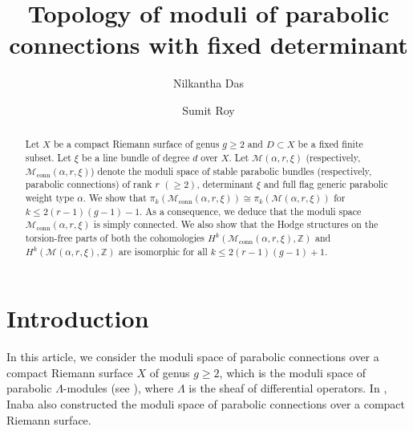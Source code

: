 \documentclass[11pt, reqno]{amsart}
\numberwithin{equation}{section}
\theoremstyle{definition}
\begin{document}
	\title[Topology of moduli of parabolic connections with fixed determinant]{Topology of moduli of parabolic connections with fixed determinant}
	
\author[N. Das]{Nilkantha Das}
\address{Department of Mathematics, Birla Institute of Technology Mesra, Mesra, Ranchi 835215, India}

	\author[S. Roy]{Sumit Roy}
 \address{Stat-Math Unit, Indian Statistical Institute, 203 B.T. Road, Kolkata 700 108, India.}


	
	\begin{abstract}
		Let $X$ be a compact Riemann surface of genus $g \geq 2$ and $D\subset X$ be a fixed finite subset. Let $\xi$ be a line bundle of degree $d$ over $X$. Let $\mathcal{M}(\alpha, r, \xi)$ (respectively, $\mathcal{M}_{\mathrm{conn}}(\alpha, r, \xi)$) denote the moduli space of stable parabolic bundles (respectively, parabolic connections) of rank $r$ $(\geq 2)$, determinant $\xi$ and full flag generic parabolic weight type $\alpha$. We show that $
  \pi_k(\mathcal{M}_{\mathrm{conn}}(\alpha, r, \xi)) \cong \pi_k(\mathcal{M}(\alpha, r, \xi)) $ for $k \leq2(r-1)(g-1)-1$. As a consequence, we deduce that the moduli space $\mathcal{M}_{\mathrm{conn}}(\alpha, r, \xi)$ is simply connected. We also show that the Hodge structures on the torsion-free parts of both the cohomologies $H^k(\mathcal{M}_{\mathrm{conn}}(\alpha, r, \xi),\mathbb{Z})$ and $H^k(\mathcal{M}(\alpha, r, \xi),\mathbb{Z})$ are isomorphic for all $k\leq 2(r-1)(g-1)+1$.
	\end{abstract}
	\maketitle
	
	\section{Introduction}

 In this article, we consider the moduli space of parabolic connections over a compact Riemann surface $X$ of genus $g \geq 2$, which is the moduli space of parabolic $\Lambda$-modules (see \cite{A17}), where $\Lambda$ is the sheaf of differential operators. In \cite{I13}, Inaba also constructed the moduli space of parabolic connections over a compact Riemann surface.
\end{document}
